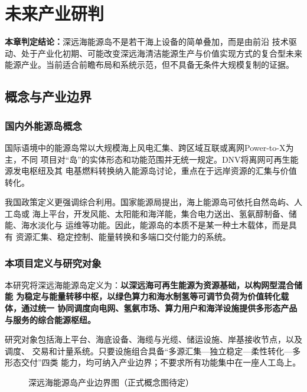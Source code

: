\chapter{未来产业研判}

\noindent\textbf{本章判定结论：}深远海能源岛不是若干海上设备的简单叠加，而是由前沿
技术驱动、处于产业化初期、可能改变深远海清洁能源生产与价值实现方式的复合型未来
能源产业。当前适合前瞻布局和系统示范，但不具备无条件大规模复制的证据。

\section{概念与产业边界}

\subsection{国内外能源岛概念}

国际语境中的能源岛常以大规模海上风电汇集、跨区域互联或离网Power-to-X为主，不同
项目对“岛”的实体形态和功能范围并无统一规定。DNV将离网可再生能源发电枢纽及其
电基燃料转换纳入能源岛讨论，重点在于远岸资源的汇集与价值转化\cite{dnv-islands}。

我国政策定义更强调综合利用。国家能源局提出，海上能源岛可依托自然岛屿、人工岛或
海上平台，开发风能、太阳能和海洋能，集合电力送出、氢氨醇制备、储能、海水淡化与
运维等功能\cite{nea-energy-island}。因此，能源岛的本质不是某一种土木载体，而是具有
资源汇集、稳定控制、能量转换和多端口交付能力的系统。

\subsection{本项目定义与研究对象}

本研究将深远海能源岛定义为：\textbf{以深远海可再生能源为资源基础，以构网型混合储能
为稳定与能量转移中枢，以绿色算力和海水制氢等可调节负荷为价值转化载体，通过统一
协同调度向电网、氢氨市场、算力用户和海洋设施提供多形态产品与服务的综合能源枢纽。}

研究对象包括海上平台、海底设备、海缆与光缆、储运设施、岸基接收节点，以及调度、
交易和计量系统。只要设施组合具备“多源汇集—独立稳定—柔性转化—多形态交付”四类
能力，均可纳入产业边界；不要求所有功能集中在一座人工岛上。

\begin{figure}[H]
\centering
{}
\caption{深远海能源岛产业边界图（正式概念图待定）}
\label{fig:c2-concept-placeholder}
\end{figure}

